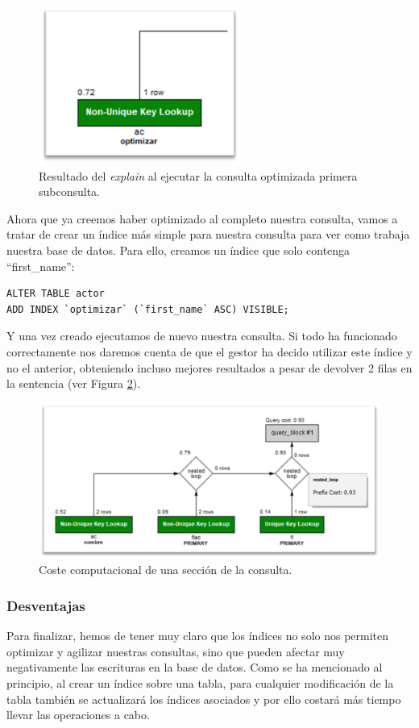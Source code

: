\documentclass[a4paper]{article}
\begin{document}
\begin{figure}[ht]
    \centering
    \includegraphics[width=0.3\columnwidth]{figs/ejecucion1part1.png}
    \caption{Resultado del \emph{explain} al ejecutar la consulta optimizada primera subconsulta.}\label{fig:ejecucion1part1}
\end{figure}

Ahora que ya creemos haber optimizado al completo nuestra consulta, vamos a tratar de crear un índice más simple para nuestra consulta para ver como trabaja nuestra base de datos. Para ello, creamos un índice que solo contenga ``first\_name'':

\begin{verbatim}
ALTER TABLE actor
ADD INDEX `optimizar` (`first_name` ASC) VISIBLE;
\end{verbatim}

Y una vez creado ejecutamos de nuevo nuestra consulta. Si todo ha funcionado correctamente nos daremos cuenta de que el gestor ha decido utilizar este índice y no el anterior, obteniendo incluso mejores resultados a pesar de devolver 2 filas en la sentencia (ver Figura \ref{fig:ejecucion1coste}).

\begin{figure}[ht]
    \centering
    \includegraphics[width=0.6\columnwidth]{figs/ejecucion1coste.png}
    \caption{Coste computacional de una sección de la consulta.}\label{fig:ejecucion1coste}
\end{figure}

\subsubsection*{Desventajas}

Para finalizar, hemos de tener muy claro que los índices no solo nos permiten optimizar y agilizar nuestras consultas, sino que pueden afectar muy negativamente las escrituras en la base de datos. Como se ha mencionado al principio, al crear un índice sobre una tabla, para cualquier modificación de la tabla también se actualizará los índices asociados y por ello costará más tiempo llevar las operaciones a cabo.
\end{document}
